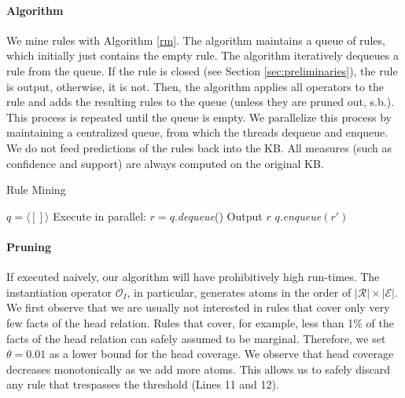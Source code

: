 \paragraph{Algorithm} 
We mine rules with Algorithm \ref{rm}. The algorithm maintains a queue of rules, which initially just contains the empty rule. The algorithm iteratively dequeues a rule from the queue. If the rule is closed (see Section \ref{sec:preliminaries}), the rule is output, otherwise, it is not. Then, the algorithm applies all operators to the rule and adds the resulting rules to the queue (unless they are pruned out, s.b.). 
This process is repeated until the queue is empty. We parallelize this process by maintaining a centralized queue, from which the threads dequeue and enqueue. We do not feed predictions of the rules back into the KB. All measures (such as confidence and support) are always computed on the original KB.
\begin{algorithm}
\caption{Rule Mining}
\label{rm}
\begin{algorithmic}[1]
    \State $q = \langle [] \rangle$
	\State Execute in parallel:
	  \State $r = q.$\emph{dequeue}()
	    \State Output $r$
	  \EndIf
		    \State $q.$\emph{enqueue}$(r')$
		  \EndIf
		\EndFor
      \EndFor		
	\EndWhile    
\EndFunction
\end{algorithmic}
\end{algorithm}


\paragraph{Pruning} If executed naively, our algorithm will have prohibitively high run-times. The instantiation operator $\mathcal{O}_I$, in particular, generates atoms in the order of $|\mathcal{R}| \times |\mathcal{E}|$. We first observe that we are usually not interested in rules that cover only very few facts of the head relation.
Rules that cover, for example, less than 1\% of the facts of the head relation can safely assumed to be marginal. Therefore, we set $\theta=0.01$ as a lower bound for the head coverage. We observe that head coverage decreases monotonically as we add more atoms. This allows us to safely discard any rule that trespasses the threshold (Lines 11 and 12).

